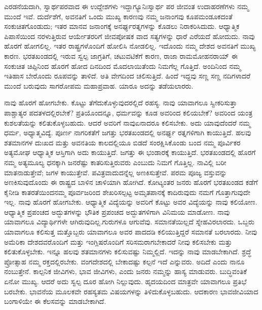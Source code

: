 ಎರಡನೆಯದಾಗಿ, ಸ್ವಾರ್ಥಪರವಾದ ಈ ಉದ್ದೇಶಗಳು ಇದ್ದಾಗ್ಯೂ\break ನಿಃಸ್ವಾರ್ಥ ಪರ ಜೀವಂತ ಉದಾಹರಣೆಗಳು ನಮ್ಮ ಮುಂದೆ ಇವೆ. ದುರ್ದೆಶೆಗೆ, ಅವನತಿಗೆ ಒಂದು ಮುಖ್ಯ ಕಾರಣವು ನಮ್ಮ ಜನಾಂಗವು ಕೂಪಮಂಡೂಕದಂತೆ ಸಂಕುಚಿತಗೊಂಡುದು; ಇತರ ಮಾನವ ಜನಾಂಗಕ್ಕೆ ಅನರ್ಘ್ಯರತ್ನಗಳನ್ನು ಕೊಡಲು ನಿರಾಕರಿಸಿದುದು. ಆಧ್ಯಾತ್ಮಿಕ ಪಿಪಾಸೆಯಿಂದ ನರಳುತ್ತಿರುವ ಆರ್ಯೇತರರಿಗೆ ಜೀವಪೋಷಕ ವಾದ ಸತ್ಯಗಳನ್ನು ಧಾರೆ ಎರೆಯದೆ ಹೋದುದು. ನಾವು ಹೊರಗೆ ಹೋಗಲಿಲ್ಲ. ಇತರ ರಾಷ್ಟ್ರಗಳೊಂದಿಗೆ ಹೋಲಿಸಿ ನೋಡಲಿಲ್ಲ. ಇದೊಂದು ನಮ್ಮ ದೇಶದ ಅವನತಿಗೆ ಮುಖ್ಯ ಕಾರಣ. ಭರತಖಂಡದಲ್ಲಿ ಇರುವ ಸ್ವಲ್ಪ ಜಾಗ್ರತಿಗೆ, ಚಟುವಟಿಕೆಗೆ ಕಾರಣ, ರಾಜಾ ರಾಮಮೋಹನರಾಯ್​ ಈ ಸಂಕುಚಿತ ಚಿಪ್ಪಿನಿಂದ ಹೊರಗೆ ಹೋದ ದಿನದಿಂದ ಮೊದಲಾಯಿತೆಂದು ನಿಮಗೆಲ್ಲ ಗೊತ್ತಿದೆ. ಅಂದಿನಿಂದ ನಮ್ಮ ಇತಿಹಾಸ ಬೇರೊಂದು ರೂಪವನ್ನು ತಾಳಿದೆ. ಅತಿ ವೇಗದಿಂದ ಚಲಿಸುತ್ತಿದೆ. ಹಿಂದೆ ಇದ್ದವು ಸಣ್ಣ ಸಣ್ಣ ನದಿಗಳಾದರೆ ಮುಂದೆ ಬರುವುದು ಸಾಗರೋಪಮ ಮಹಾಪ್ರವಾಹ. ಯಾರೂ ಅದನ್ನು ತಡೆಯಲಾರರು.

ನಾವು ಹೊರಗೆ ಹೋಗಬೇಕು. ಕೊಟ್ಟು ತೆಗೆದುಕೊಳ್ಳುವುದರಲ್ಲಿದೆ ರಹಸ್ಯ. ನಾವು ಯಾವಾಗಲೂ ಸ್ವೀಕರಿಸುತ್ತಾ ಪಾಶ್ಚಾತ್ಯರ ಪದತಳದಲ್ಲಿರಬೇಕೆ? ಪ್ರತಿಯೊಂದನ್ನೂ, ಧರ್ಮವನ್ನು ಕೂಡ ಅವರಿಂದ ಕಲಿಯಬೇಕೆ? ಅವರಿಂದ ಯಂತ್ರ ಕುಶಲತೆಯನ್ನು ಕಲಿತುಕೊಳ್ಳಬಹುದು. ಆದರೆ ಅವರಿಗೆ ನಾವು\break ಏನಾದರೂ ಕಲಿಸಬೇಕು. ಅದು ಯಾವುದೆಂದರೆ ನಮ್ಮ ಧರ್ಮ, ಅಧ್ಯಾತ್ಮವಿದ್ಯೆ. ಪೂರ್ಣ ನಾಗರಿಕತೆಗೆ ಜಗತ್ತು ಭರತಖಂಡದಲ್ಲಿ ಅನರ್ಘ್ಯ ರತ್ನಗಳಿಗಾಗಿ ಕಾಯುತ್ತಿದೆ. ಹಲವು ಶತಮಾನಗಳ ದುಃಖದ ಮತ್ತು ಅವನತಿಯ ಕಾಲದಲ್ಲಿಯೂ ಬಿಡದೆ ಸಂರಕ್ಷಿಸಿಕೊಂಡು ಬಂದ ನಮ್ಮ ಪೂರ್ವಿಕರ ಅತ್ಯಮೋಘ ಆಧ್ಯಾತ್ಮಿಕ ಆಸ್ತಿಗಾಗಿ ಅದು ಕಾಯುತ್ತಿದೆ. ಜಗತ್ತು ಈ ಭಂಡಾರಕ್ಕೆ ಕಾಯುತ್ತಿದೆ. ಭರತಖಂಡದಲ್ಲಿ ಹೊರಗೆ ನಮ್ಮ ಅತ್ಯಮೂಲ್ಯ ಧನಕ್ಕಾಗಿ ಜನರೆಷ್ಟು ಕಾತರಿಸುತ್ತಿರುವರು ಎಂಬುದು ನಿಮಗೆ ಗೊತ್ತಿಲ್ಲ. ನಾವಿಲ್ಲಿ ಬರೀ ಮಾತನಾಡುತ್ತೇವೆ; ಜಗಳ ಕಾಯುತ್ತೇವೆ. ಪವಿತ್ರವಾದುದನ್ನೆಲ್ಲ ಅಣಕಿಸುತ್ತೇವೆ. ಪರಮ ಪೂಜ್ಯ ವಸ್ತುವನ್ನು ಅಣಕಿಸುವುದೊಂದು ಈ ರಾಷ್ಟ್ರದ ಬಾಳಿನ ಚಾಳಿಯಾಗಿ ಹೋಗಿದೆ. ಕೋಟ್ಯಂತರ ಜನರು ಹೊರಗೆ ಭರತಖಂಡದ ಕಡೆಗೆ ಕೈನೀಡಿ ಕಾತರತೆಯಿಂದ\break ನಮ್ಮ ಪೂರ್ವಜರಿಂದ ಶೇಖರಿಸಲ್ಪಟ್ಟ ಅಮೃತಪಾನಕ್ಕೆ ಕಾದಿರುವುದು ನಮಗೆ ಗೊತ್ತಾಗುವುದೇ ಇಲ್ಲ. ನಾವು ಹೊರಗೆ ಹೋಗಬೇಕು. ಆಧ್ಯಾತ್ಮಿಕ ವಿದ್ಯೆಯನ್ನು ಅವರಿಗೆ ಕೊಟ್ಟು ಅವರ ವಿದ್ಯೆಯನ್ನು ನಾವು ಕಲಿಯೋಣ. ಆಧ್ಯಾತ್ಮಿಕ ಪ್ರಪಂಚದ ಅದ್ಭುತಗಳನ್ನು ಭೌತಿಕ ಪ್ರಪಂಚದ ಅದ್ಭುತಗಳಿಗಾಗಿ ವಿನಿಮಯ ಮಾಡೋಣ. ನಾವು ಯಾವಾಗಲೂ ವಿದ್ಯಾರ್ಥಿಗಳೇ ಆಗಿರುವುದಿಲ್ಲ.\break ಗುರುಗಳೂ ಆಗುವೆವು. ಸಮಾನತೆಯಿಲ್ಲದೆ ಸ್ನೇಹವಿರಲಾರದು. ಒಬ್ಬರು ಯಾವಾಗಲೂ ಕಲಿಸುತ್ತ ಮತ್ತೊಬ್ಬರು ಯಾವಾಗಲೂ ಅವರ ಪಾದದಡಿ ಕಲಿಯುತ್ತಿದ್ದರೆ ಸಮಾನತೆ ಬರಲಾರದು. ನೀವು ಅಮೆರಿಕಾ ದೇಶದವರೊಂದಿಗೆ ಮತ್ತು ಇಂಗ್ಲಿಷರೊಂದಿಗೆ ಸರಿಸಮರಾಗಬೇಕಾದರೆ ನೀವು ಕಲಿಸಬೇಕು ಮತ್ತು ಕಲಿತುಕೊಳ್ಳಬೇಕು. ಇನ್ನೂ ಹಲವು ಶತಮಾನಗಳು ಕಲಿಸುವಷ್ಟು ನಿಮ್ಮಲ್ಲಿದೆ. ಇದನ್ನು ನಾವು ಮಾಡಬೇಕಾಗಿದೆ. ಶ್ರದ್ಧೆ ಪ್ರೋತ್ಸಾಹ ನಮ್ಮ ರಕ್ತದಲ್ಲಿರಬೇಕು. ವಂಗದೇಶದಲ್ಲಿ ಬೇಕಾದಷ್ಟು ಕಲ್ಪನೆ ಇದೆ ಎನ್ನುವರು. ಅದಿದೆ ಎಂದು ನಾನೂ ನಂಬುತ್ತೇನೆ. ಕಾಲ್ಪನಿಕ ಜೀವಿಗಳು, ಭಾವ ಜೀವಿಗಳು, ಎಂದು ಜನರು ನಮ್ಮನ್ನು ಹಾಸ್ಯ ಮಾಡುವರು. ಬುದ್ಧಿವಂತಿಕೆ ಏನೋ ಮುಖ್ಯ. ಆದರೆ ಅದು ಸ್ವಲ್ಪ ದೂರ ಹೋಗಿ ನಿಲ್ಲುವುದು. ಹೃದಯದಿಂದ ಮಾತ್ರವೇ ಯಾವಾಗಲೂ ಪ್ರತಿಭೆ ಬರಬೇಕು. ಭಾವನೆಯ ಮೂಲಕವೇ ರಹಸ್ಯತಮ ವಿಷಯಗಳನ್ನು ತಿಳಿದುಕೊಳ್ಳಬಹುದು. ಆದಕಾರಣ ಭಾವಜೀವಿಯಾದ ಬಂಗಾಳಿಯೇ ಈ ಕೆಲಸವನ್ನು ಮಾಡಬೇಕಾಗಿದೆ.

